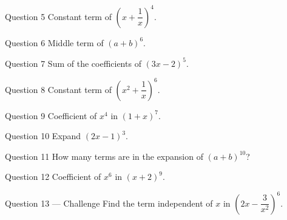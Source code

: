 \documentclass[11pt]{article}
\begin{document}
\begin{qbox}{Question 5}
Constant term of $\left(x+\dfrac1x\right)^4$.\workspace{2.4cm}
\end{qbox}

\begin{qbox}{Question 6}
Middle term of $(a+b)^6$.\workspace{2.4cm}
\end{qbox}

\begin{qbox}{Question 7}
Sum of the coefficients of $(3x-2)^5$.\workspace{2.4cm}
\end{qbox}

\begin{qbox}{Question 8}
Constant term of $\left(x^2+\dfrac1x\right)^6$.\workspace{2.4cm}
\end{qbox}

\begin{qbox}{Question 9}
Coefficient of $x^4$ in $(1+x)^7$.\workspace{2.4cm}
\end{qbox}

\begin{qbox}{Question 10}
Expand $(2x-1)^3$.\workspace{2.4cm}
\end{qbox}

\begin{qbox}{Question 11}
How many terms are in the expansion of $(a+b)^{10}$?\workspace{2.4cm}
\end{qbox}

\begin{qbox}{Question 12}
Coefficient of $x^6$ in $(x+2)^9$.\workspace{2.4cm}
\end{qbox}

\begin{qbox}{Question 13 --- Challenge}
Find the term independent of $x$ in $\left(2x-\dfrac{3}{x^2}\right)^6$.\workspace{3.4cm}
\end{qbox}

\clearpage
{}
\end{document}
